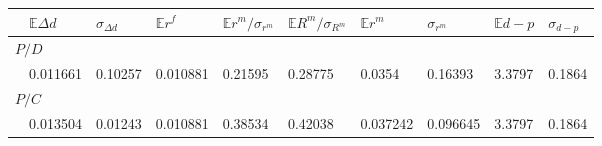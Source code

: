 \begin{tabular}{@{}llllllllll@{}}
\toprule 
 & $\mathbb{E}\Delta d$ & $\sigma_{\Delta d}$ & $\mathbb{E}r^f$ & $\mathbb{E}r^m/\sigma _{r^m}$ & $\mathbb{E}R^m/\sigma _{R^m}$ & $\mathbb{E}r^m$ & $\sigma_{r^m}$ & $\mathbb{E}d-p$ & $\sigma_{d-p}$  \\ 
\midrule 
\multicolumn{10}{l}{$P/D$}\\
 &0.011661&0.10257& 0.010881 & 0.21595 & 0.28775 & 0.0354 & 0.16393 & 3.3797 & 0.1864 \\ 
\multicolumn{10}{l}{$P/C$}\\
 &0.013504&0.01243& 0.010881 & 0.38534 & 0.42038 & 0.037242 & 0.096645 & 3.3797 & 0.1864 \\ 
\bottomrule 
\end{tabular}
